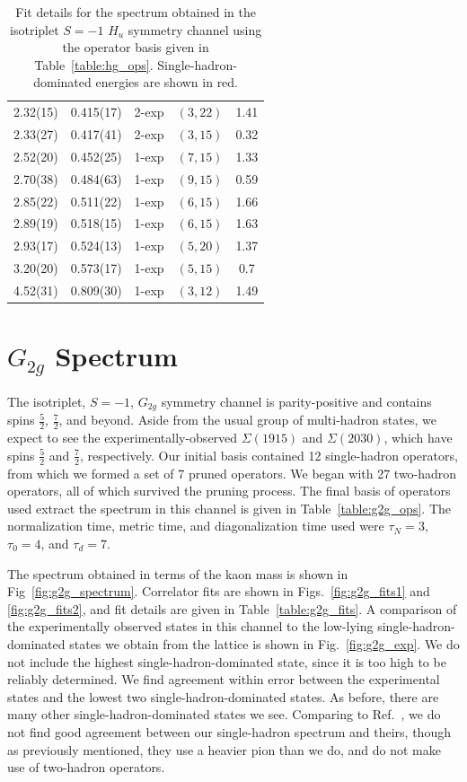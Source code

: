 \begin{table}[H]
\begin{tabu}{c|c|c|c|c}
        2.32(15)&0.415(17)&2{-}exp&$(3, 22)$&1.41 \\
        2.33(27)&0.417(41)&2{-}exp&$(3, 15)$&0.32 \\
        2.52(20)&0.452(25)&1{-}exp&$(7, 15)$&1.33 \\
        2.70(38)&0.484(63)&1{-}exp&$(9, 15)$&0.59 \\
        2.85(22)&0.511(22)&1{-}exp&$(6, 15)$&1.66 \\
        2.89(19)&0.518(15)&1{-}exp&$(6, 15)$&1.63 \\
        \rowfont{\color{red}}
        2.93(17)&0.524(13)&1{-}exp&$(5, 20)$&1.37 \\ 
        \rowfont{\color{red}}
        3.20(20)&0.573(17)&1{-}exp&$(5, 15)$&0.7 \\
        4.52(31)&0.809(30)&1{-}exp&$(3, 12)$&1.49
    \end{tabu}
    \caption[Fit details for the spectrum obtained in the isotriplet $S=-1$ $H_u$ symmetry channel using the operator basis given in Table~\ref{table:hg_ops}.]{Fit details for the spectrum obtained in the isotriplet $S=-1$ $H_u$ symmetry channel using the operator basis given in Table~\ref{table:hg_ops}. Single-hadron-dominated energies are shown in red.}\label{table:hu_fits}
\end{table}
\renewcommand{\arraystretch}{1.5}

\section{$G_{2g}$ Spectrum}
The isotriplet, $S=-1$, $G_{2g}$ symmetry channel is parity-positive and contains spins $\frac{5}{2}$, $\frac{7}{2}$, and beyond. Aside from the usual group of multi-hadron states, we expect to see the experimentally-observed $\Sigma(1915)$ and $\Sigma(2030)$, which have spins $\frac{5}{2}$ and $\frac{7}{2}$, respectively. Our initial basis contained 12 single-hadron operators, from which we formed a set of 7 pruned operators. We began with 27 two-hadron operators, all of which survived the pruning process. The final basis of operators used extract the spectrum in this channel is given in Table~\ref{table:g2g_ops}. The normalization time, metric time, and diagonalization time used were $\tau_N=3$, $\tau_0=4$, and $\tau_d=7$.

The spectrum obtained in terms of the kaon mass is shown in Fig~\ref{fig:g2g_spectrum}. Correlator fits are shown in Figs.~\ref{fig:g2g_fits1} and \ref{fig:g2g_fits2}, and fit details are given in Table~\ref{table:g2g_fits}. A comparison of the experimentally observed states in this channel to the low-lying single-hadron-dominated states we obtain from the lattice is shown in Fig.~\ref{fig:g2g_exp}. We do not include the highest single-hadron-dominated state, since it is too high to be reliably determined. We find agreement within error between the experimental states and the lowest two single-hadron-dominated states. As before, there are many other single-hadron-dominated states we see. Comparing to Ref.~\cite{Edwards:2012fx}, we do not find good agreement between our single-hadron spectrum and theirs, though as previously mentioned, they use a heavier pion than we do, and do not make use of two-hadron operators.

